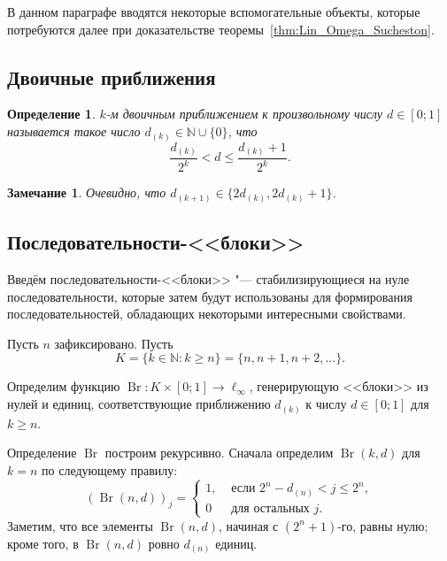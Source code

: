 \documentclass[a4paper,14pt]{article} %
\theoremstyle{plain}
\newtheorem{remark}[lemma]{Замечание}
\newtheorem{definition}[lemma]{Определение}
\begin{document}
В данном параграфе вводятся некоторые вспомогательные объекты,
которые потребуются далее при доказательстве теоремы~\ref{thm:Lin_Omega_Sucheston}.

\subsection{Двоичные приближения}	

\begin{definition}
	$k$-м двоичным приближением к произвольному числу $d\in[0;1]$
	называется такое число $d_{(k)}\in\mathbb{N}\cup\{0\}$,
	что
	\begin{equation}
		\label{eq:binary_approximations_for_number}
		\frac{d_{(k)}}{2^k} < d \leq \frac{d_{(k)}+1}{2^k}
		.
	\end{equation}
\end{definition}

\begin{remark}
	Очевидно, что $d_{(k+1)}\in\{2d_{(k)},2d_{(k)}+1\}$.
\end{remark}

\subsection{Последовательности-<<блоки>>}

Введём последовательности-<<блоки>> "---
стабилизирующиеся на нуле последовательности,
которые затем будут использованы для формирования последовательностей,
обладающих некоторыми интересными свойствами.

Пусть $n$ зафиксировано.
Пусть
\begin{equation}
	K = \{k\in\mathbb{N} : k \geq n\} = \{n, n+1, n+2, ...\}
	.
\end{equation}


Определим функцию $\operatorname{Br}:K\times [0;1] \to \ell_\infty$,
генерирующую <<блоки>> из нулей и единиц,
соответствующие приближению $d_{(k)}$ к числу $d\in[0;1]$ для $k \geq n$.

Определение $\operatorname{Br}$ построим рекурсивно.
Сначала определим $\operatorname{Br}(k,d)$ для $k=n$ по следующему правилу:
\begin{equation}
	(\operatorname{Br}(n,d))_j = \begin{cases}
		1, & \mbox{~если~} 2^n - d_{(n)} < j \leq 2^n,
		\\
		0  & \mbox{~для остальных~} j
		.
	\end{cases}
\end{equation}
Заметим, что все элементы $\operatorname{Br}(n,d)$, начиная с $(2^n+1)$-го, равны нулю;
кроме того, в $\operatorname{Br}(n,d)$ ровно $d_{(n)}$ единиц.
\end{document}
